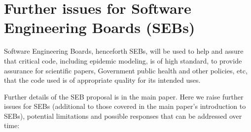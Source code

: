 \documentclass[10pt,a4paper]{article}
\begin{document}
\newpage

\section{Further issues for Software Engineering Boards (SEBs)}

Software Engineering Boards, henceforth SEBs, will be used to help and assure that critical code, including epidemic modeling, is of high standard, to provide assurance for scientific papers, Government public health and other policies, etc, that the code used is of appropriate quality for its intended uses.  

Further details of the SEB proposal is in the main paper. Here we raise further issues for SEBs (additional to those covered in the main paper's introduction to SEBs), potential limitations and possible responses that can be addressed over time:
\end{document}
